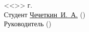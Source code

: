 \pagestyle{empty}
\vspace{\fill}
\noindent<<\underline{\hspace{1cm}}>> \underline{\hspace{5cm}} \the\year г.\\
Студент \hspace{1cm} \underline{Чечеткин~И.~А.\hspace{2.75cm}} \hspace{2cm} (\underline{\hspace{5cm}})\\
Руководитель \underline{\hspace{6.1cm}} \hspace{2cm} (\underline{\hspace{5cm}})\\
